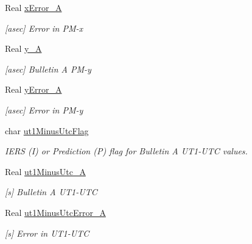 \begin{DoxyCompactItemize}
Real \hyperlink{structlibrary_1_1physics_1_1coord_1_1frame_1_1provider_1_1iers_1_1_finals2000_a_1_1_data_ad9dd62ea76b5816126aa4775dd136e19}{x\+Error\+\_\+A}
\begin{DoxyCompactList}\small\item\em \mbox{[}asec\mbox{]} Error in P\+M-\/x \end{DoxyCompactList}\item 
Real \hyperlink{structlibrary_1_1physics_1_1coord_1_1frame_1_1provider_1_1iers_1_1_finals2000_a_1_1_data_a1c2408c7d5bf730fcf79e0d804be7a05}{y\+\_\+A}
\begin{DoxyCompactList}\small\item\em \mbox{[}asec\mbox{]} Bulletin A P\+M-\/y \end{DoxyCompactList}\item 
Real \hyperlink{structlibrary_1_1physics_1_1coord_1_1frame_1_1provider_1_1iers_1_1_finals2000_a_1_1_data_af575bb27e0dd679ad190779375b65994}{y\+Error\+\_\+A}
\begin{DoxyCompactList}\small\item\em \mbox{[}asec\mbox{]} Error in P\+M-\/y \end{DoxyCompactList}\item 
char \hyperlink{structlibrary_1_1physics_1_1coord_1_1frame_1_1provider_1_1iers_1_1_finals2000_a_1_1_data_a9df8e44604860678c3d9535e68e963ef}{ut1\+Minus\+Utc\+Flag}
\begin{DoxyCompactList}\small\item\em I\+E\+RS (I) or Prediction (P) flag for Bulletin A U\+T1-\/\+U\+TC values. \end{DoxyCompactList}\item 
Real \hyperlink{structlibrary_1_1physics_1_1coord_1_1frame_1_1provider_1_1iers_1_1_finals2000_a_1_1_data_a8676fabeeefb9ffc0498be3a5ef875b2}{ut1\+Minus\+Utc\+\_\+A}
\begin{DoxyCompactList}\small\item\em \mbox{[}s\mbox{]} Bulletin A U\+T1-\/\+U\+TC \end{DoxyCompactList}\item 
Real \hyperlink{structlibrary_1_1physics_1_1coord_1_1frame_1_1provider_1_1iers_1_1_finals2000_a_1_1_data_ad200ded97bd1484d10db2a9eda9c7dc9}{ut1\+Minus\+Utc\+Error\+\_\+A}
\begin{DoxyCompactList}\small\item\em \mbox{[}s\mbox{]} Error in U\+T1-\/\+U\+TC \end{DoxyCompactList}\item 

\end{DoxyCompactItemize}
